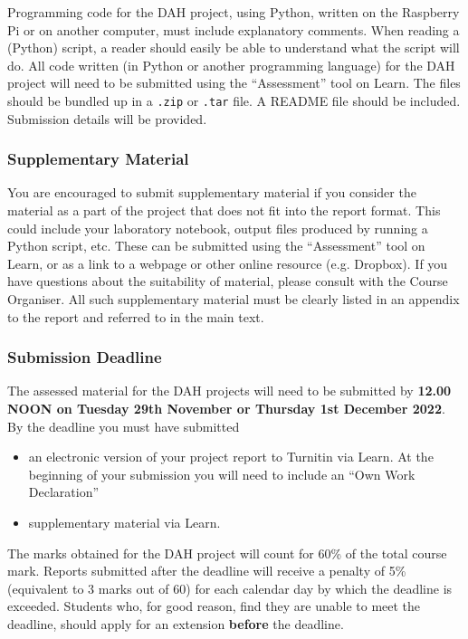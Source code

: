 Programming code for the DAH project, using Python, written on the Raspberry Pi or on another computer, must include explanatory comments.
When reading a (Python) script, a reader should easily be able to understand what the script will do.
All code written (in Python or another programming language) for the DAH project will need to be submitted using the ``Assessment'' tool on Learn.
The files should be bundled up in a \texttt{.zip} or \texttt{.tar} file.
A README file should be included.
Submission details will be provided.

\subsubsection{Supplementary Material}

You are encouraged to submit supplementary material if you consider the material as a part of the project that does not fit into the report format. 
This could include your laboratory notebook, output files produced by running a Python script, etc.
These can be submitted using the ``Assessment'' tool on Learn, or as a link to a webpage or other online resource (e.g. Dropbox).
If you have questions about the suitability of material, please consult with the Course Organiser.
All such supplementary material must be clearly listed in an appendix to the report and referred to in the main text. 

\subsubsection{Submission Deadline}

The assessed material for the DAH projects will need to be submitted by {\bf 12.00 NOON on Tuesday 29th November or Thursday 1st December 2022}.
By the deadline you must have submitted
\begin{itemize}
\item an electronic version of your project report to Turnitin via Learn. At the beginning of your submission you will need to include an ``Own Work Declaration''
\item supplementary material via Learn. %
\end{itemize}
The marks obtained for the DAH project will count for 60\% of the total course mark.
Reports submitted after the deadline will receive a penalty of 5\% (equivalent to 3 marks out of 60) for each calendar day by which the deadline is exceeded.
Students who, for good reason, find they are unable to meet the deadline, should apply for an extension {\bf before} the deadline.

